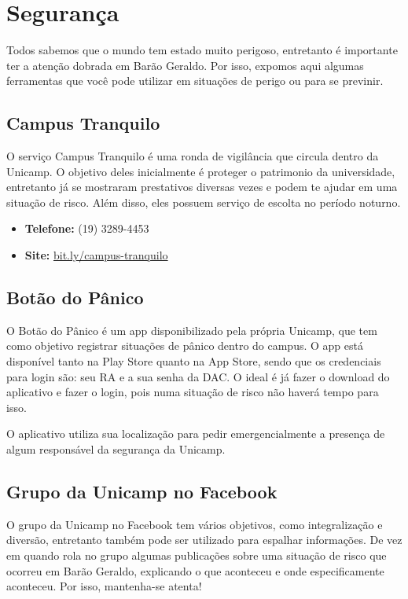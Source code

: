 
\section{Segurança}

Todos sabemos que o mundo tem estado muito perigoso, entretanto é importante ter
a atenção dobrada em Barão Geraldo. Por isso, expomos aqui algumas ferramentas
que você pode utilizar em situações de perigo ou para se previnir.

\subsection{Campus Tranquilo}

O serviço Campus Tranquilo é uma ronda de vigilância que circula dentro da
Unicamp. O objetivo deles inicialmente é proteger o patrimonio da universidade,
entretanto já se mostraram prestativos diversas vezes e podem te ajudar em uma
situação de risco. Além disso, eles possuem serviço de escolta no período
noturno.

\begin{itemize}
\item \textbf{Telefone:} (19) 3289-4453
\item \textbf{Site:} \url{bit.ly/campus-tranquilo}
\end{itemize}


\subsection{Botão do Pânico}

O Botão do Pânico é um app disponibilizado pela própria Unicamp, que tem como
objetivo registrar situações de pânico dentro do campus. O app está disponível
tanto na Play Store quanto na App Store, sendo que os credenciais para login
são: seu RA e a sua senha da DAC. O ideal é já fazer o download do aplicativo e
fazer o login, pois numa situação de risco não haverá tempo para isso.

O aplicativo utiliza sua localização para pedir emergencialmente a presença de
algum responsável da segurança da Unicamp.

\subsection{Grupo da Unicamp no Facebook}

O grupo da Unicamp no Facebook tem vários objetivos, como integralização e
diversão, entretanto também pode ser utilizado para espalhar informações. De vez
em quando rola no grupo algumas publicações sobre uma situação de risco que
ocorreu em Barão Geraldo, explicando o que aconteceu e onde especificamente
aconteceu. Por isso, mantenha-se atenta!
